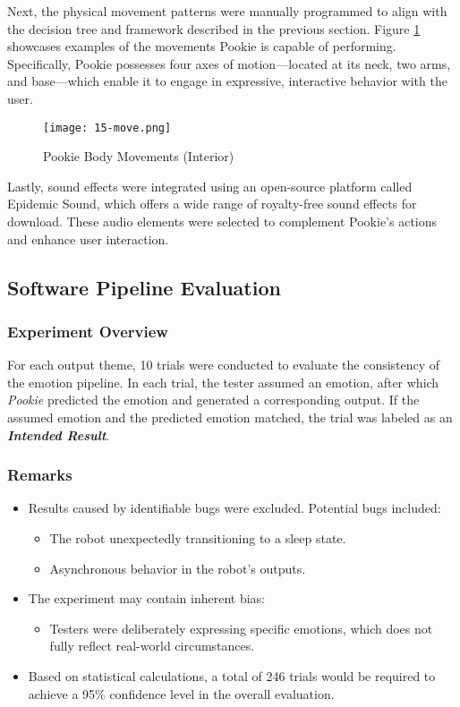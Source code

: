 \newpage
Next, the physical movement patterns were manually programmed to align with the decision tree and framework described in the previous section. Figure \ref{fig:15-move} showcases examples of the movements Pookie is capable of performing. Specifically, Pookie possesses four axes of motion—located at its neck, two arms, and base—which enable it to engage in expressive, interactive behavior with the user.

\begin{figure}[!ht]
    \centering
    \texttt{[image: 15-move.png]}
    \captionsetup{justification=centering}
    \caption{Pookie Body Movements (Interior)}
    \label{fig:15-move}
\end{figure}

Lastly, sound effects were integrated using an open-source platform called Epidemic Sound, which offers a wide range of royalty-free sound effects for download. These audio elements were selected to complement Pookie’s actions and enhance user interaction.

\subsection{Software Pipeline Evaluation}

\subsubsection{Experiment Overview}
For each output theme, 10 trials were conducted to evaluate the consistency of the emotion pipeline. In each trial, the tester assumed an emotion, after which \textit{Pookie} predicted the emotion and generated a corresponding output. If the assumed emotion and the predicted emotion matched, the trial was labeled as an \textbf{\textit{Intended Result}}.

\newpage
\subsubsection{Remarks}
\begin{itemize}
    \item Results caused by identifiable bugs were excluded. Potential bugs included:
    \begin{itemize}
        \item The robot unexpectedly transitioning to a sleep state.
        \item Asynchronous behavior in the robot's outputs.
    \end{itemize}
    \item The experiment may contain inherent bias:
    \begin{itemize}
        \item Testers were deliberately expressing specific emotions, which does not fully reflect real-world circumstances.
    \end{itemize}
    \item Based on statistical calculations, a total of 246 trials would be required to achieve a 95\% confidence level in the overall evaluation.
\end{itemize}

